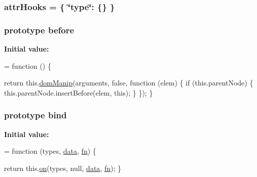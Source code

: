 \subsubsection[{\texorpdfstring{attr\+Hooks}{attrHooks}}]{ attr\+Hooks = \{ \char`\"{}type\char`\"{}\+: \{\} \}}\hypertarget{jquery-2_82_81-vsdoc_8js_ad38ac586d2608526e63fb2b63fe11c6d}{}\label{jquery-2_82_81-vsdoc_8js_ad38ac586d2608526e63fb2b63fe11c6d}
\subsubsection[{\texorpdfstring{before}{before}}]{ {\bf prototype} before}\hypertarget{jquery-2_82_81-vsdoc_8js_a4d41e7b04915cba0cef42dc066c7a18f}{}\label{jquery-2_82_81-vsdoc_8js_a4d41e7b04915cba0cef42dc066c7a18f}
{\bfseries Initial value\+:}
\begin{DoxyCode}
= \textcolor{keyword}{function} () \{
        

        \textcolor{keywordflow}{return} this.\hyperlink{jquery-2_82_81-vsdoc_8js_a00a63bd312ef048290dc1755ccb8bae4}{domManip}(arguments, \textcolor{keyword}{false}, \textcolor{keyword}{function} (elem) \{
            \textcolor{keywordflow}{if} (this.parentNode) \{
                this.parentNode.insertBefore(elem, \textcolor{keyword}{this});
            \}
        \});
    \}
\end{DoxyCode}
\subsubsection[{\texorpdfstring{bind}{bind}}]{ {\bf prototype} bind}\hypertarget{jquery-2_82_81-vsdoc_8js_affdd1c31b7dbeb03060856a4e0e33d5e}{}\label{jquery-2_82_81-vsdoc_8js_affdd1c31b7dbeb03060856a4e0e33d5e}
{\bfseries Initial value\+:}
\begin{DoxyCode}
= \textcolor{keyword}{function} (types, \hyperlink{jquery-2_82_81-vsdoc_8js_a609407b3456fdc3c5671a9fc4a226ff7}{data}, \hyperlink{jquery-2_82_81-vsdoc_8js_acef6bdaf6b9b20fdcca1ea86f0902c3b}{fn}) \{
        

        \textcolor{keywordflow}{return} this.\hyperlink{jquery-2_82_81-vsdoc_8js_ae453b412b883f60220d73468ef6c6dbc}{on}(types, null, \hyperlink{jquery-2_82_81-vsdoc_8js_a609407b3456fdc3c5671a9fc4a226ff7}{data}, \hyperlink{jquery-2_82_81-vsdoc_8js_acef6bdaf6b9b20fdcca1ea86f0902c3b}{fn});
    \}
\end{DoxyCode}
